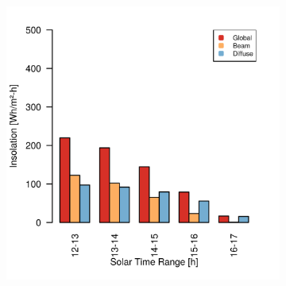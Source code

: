 \begin{figure}[h]
\captionsetup[subfigure]{justification=centering}
\centering
    \setlength{\subfigureWidth}{0.50\textwidth}
    \setlength{\graphicsHeight}{80mm}
    \hypersetup{hidelinks=true}%
    \begin{subfigure}[t]{\subfigureWidth}
        \centering
            \includegraphics[height=\graphicsHeight]{sections/mars-solar-energy/solar-radiation/plots/ih-ibh-and-idh-variation-1-for-ls-71-phi-34-tau-04-and-albedo-027.png}
            \label{fig:plot:sub:insolation-phi-m34}
    \end{subfigure}\hfill
    \begin{subfigure}[t]{\subfigureWidth}
        \centering

\end{subfigure}
\end{figure}
